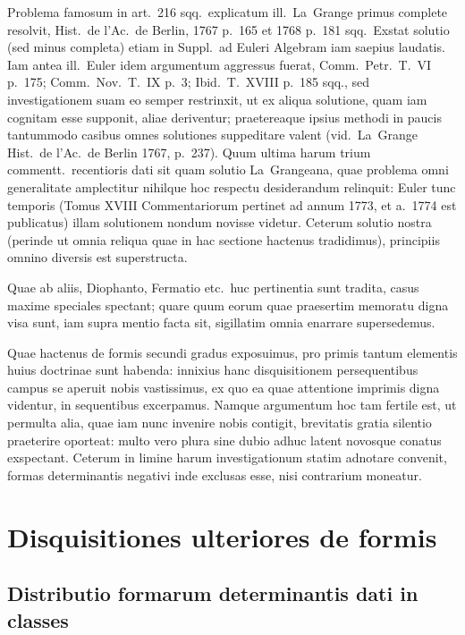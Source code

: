 \documentclass[12pt,a4paper]{article}
\theoremstyle{plain}
\theoremstyle{definition}
\theoremstyle{remark}
\begin{document}
Problema famosum in art.~216 sqq.\ explicatum ill.~La~Grange primus complete resolvit, Hist.\ de l'Ac.\ de Berlin, 1767 p.~165 et 1768 p.~181 sqq.\ Exstat solutio (sed minus completa) etiam in Suppl.\ ad Euleri Algebram iam saepius laudatis. Iam antea ill.~Euler idem argumentum aggressus fuerat, Comm.\ Petr.\ T.~VI p.~175; Comm.\ Nov.\ T.~IX p.~3; Ibid.\ T.~XVIII p.~185 sqq., sed investigationem suam eo semper restrinxit, ut ex aliqua solutione, quam iam cognitam esse supponit, aliae deriventur; praetereaque ipsius methodi in paucis tantummodo casibus omnes solutiones suppeditare valent (vid.\ La~Grange Hist.\ de l'Ac.\ de Berlin 1767, p.~237). Quum ultima harum trium commentt.\ recentioris dati sit quam solutio La~Grangeana, quae problema omni generalitate amplectitur nihilque hoc respectu desiderandum relinquit: Euler tunc temporis (Tomus XVIII Commentariorum pertinet ad annum 1773, et a.\ 1774 est publicatus) illam solutionem nondum novisse videtur. Ceterum solutio nostra (perinde ut omnia reliqua quae in hac sectione hactenus tradidimus), principiis omnino diversis est superstructa.

Quae ab aliis, Diophanto, Fermatio etc.\ huc pertinentia sunt tradita, casus maxime speciales spectant; quare quum eorum quae praesertim memoratu digna visa sunt, iam supra mentio facta sit, sigillatim omnia enarrare supersedemus.

Quae hactenus de formis secundi gradus exposuimus, pro primis tantum elementis huius doctrinae sunt habenda: innixius hanc disquisitionem persequentibus campus se aperuit nobis vastissimus, ex quo ea quae attentione imprimis digna videntur, in sequentibus excerpamus. Namque argumentum hoc tam fertile est, ut permulta alia, quae iam nunc invenire nobis contigit, brevitatis gratia silentio praeterire oporteat: multo vero plura sine dubio adhuc latent novosque conatus exspectant. Ceterum in limine harum investigationum statim adnotare convenit, formas determinantis negativi inde exclusas esse, nisi contrarium moneatur.


\section*{Disquisitiones ulteriores de formis}

\subsection*{Distributio formarum determinantis dati in classes}
\end{document}
